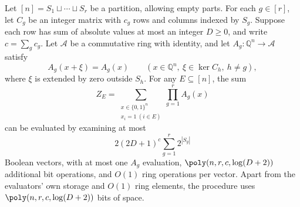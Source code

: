 \begin{lemma}\label{lem:measurement-separation}
Let $[n]=S_1\sqcup\cdots\sqcup S_r$ be a partition, allowing empty parts.
For each $g\in[r]$, let $C_g$ be an integer matrix with $c_g$ rows
and columns indexed by $S_g$. Suppose each row has sum of absolute
values at most an integer $D\ge0$, and write $c=\sum_g c_g$.
Let $\mathcal A$ be a commutative ring with identity, and let
$A_g:\mathbb Q^n\to\mathcal A$ satisfy
\[
 A_g(x+\xi)=A_g(x)
 \qquad
 (x\in\mathbb Q^n,\ \xi\in\ker C_h,\ h\ne g),
\]
where $\xi$ is extended by zero outside $S_h$.
For any $E\subseteq[n]$, the sum
\[
 Z_E=\sum_{\substack{x\in\{0,1\}^n\\x_i=1\ (i\in E)}}
           \prod_{g=1}^r A_g(x)
\]
can be evaluated by examining at most
\[
 2(2D+1)^c\sum_{g=1}^r2^{|S_g|}
\]
Boolean vectors, with at most one $A_g$ evaluation,
$\poly(n,r,c,\log(D+2))$ additional bit operations, and $O(1)$ ring
operations per vector. Apart from the evaluators' own storage and
$O(1)$ ring elements, the procedure uses $\poly(n,r,c,\log(D+2))$
bits of space.
\end{lemma}

